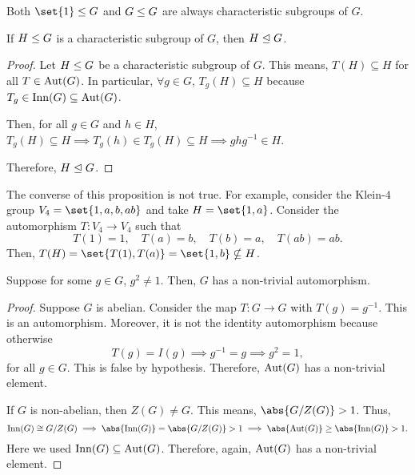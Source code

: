 \documentclass[11pt]{penrose}
\begin{document}
\begin{remark}
    Both $\set{1} \subgroup G$ and $G \mathrel{\leq} G$ are always characteristic subgroups of $G$.
\end{remark}

\begin{nprop}
    If $H \mathrel{\leq} G$ is a characteristic subgroup of $G$, then $H \mathrel{\trianglelefteq} G$.
\end{nprop}
\begin{proof}
    Let $H \mathrel{\leq} G$ be a characteristic subgroup of $G$. This means, $T(H) \subseteq H$ for all $T \in \operatorname{Aut}(G)$. In particular, $\forall g \in G$, $T_{g}(H) \subseteq H$ because $T_{g} \in \operatorname{Inn}(G) \subseteq \operatorname{Aut}(G)$.

    Then, for all $g \in G$ and $h \in H$, $T_{g}(H) \subseteq H \implies T_{g}(h) \in T_{g}(H) \subseteq H \implies g h g^{-1} \in H$.

    Therefore, $H \mathrel{\trianglelefteq} G$.
\end{proof}

\begin{remark}
    The converse of this proposition is not true. For example, consider the Klein-$4$ group $V_{4} = \set{1, a, b, ab}$ and take $H = \set{1, a}$. Consider the automorphism $T: V_{4} \to V_{4}$ such that
    \begin{equation*}
        T(1) = 1, \quad
        T(a) = b, \quad
        T(b) = a, \quad
        T(ab) = ab.
    \end{equation*}
    Then, $T(H) = \set{T(1), T(a)} = \set{1, b} \nsubseteq H$.
\end{remark}

\begin{nprop}
    Suppose for some $g \in G$, $g^{2} \neq 1$. Then, $G$ has a non-trivial automorphism.
\end{nprop}
\begin{proof}
    Suppose $G$ is abelian. Consider the map $T: G \to G$ with $T(g) = g^{-1}$. This is an automorphism. Moreover, it is not the identity automorphism because otherwise
    \begin{equation*}
        T(g) = I(g)
        \implies
        g^{-1} = g
        \implies
        g^{2} = 1,
    \end{equation*}
    for all $g \in G$. This is false by hypothesis. Therefore, $\operatorname{Aut}(G)$ has a non-trivial element.

    If $G$ is non-abelian, then $Z(G) \neq G$. This means, $\abs{G / Z(G)} > 1$. Thus,
    \begin{equation*}
        \Inn(G) \isom G / Z(G)
        \implies
        \abs{\Inn(G)} = \abs{G / Z(G)} > 1
        \implies
        \abs{\Aut(G)} \geq \abs{\Inn(G)} > 1.
    \end{equation*}
    Here we used $\operatorname{Inn}(G) \subseteq \operatorname{Aut}(G)$. Therefore, again, $\operatorname{Aut}(G)$ has a non-trivial element.
\end{proof}
\end{document}
